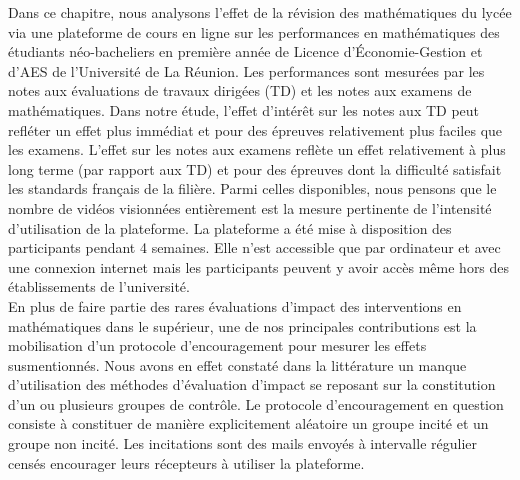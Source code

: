 \documentclass[
]{book}
\begin{document}
Dans ce chapitre, nous analysons l'effet de la révision des mathématiques du lycée via une plateforme de cours en ligne sur les performances en mathématiques des étudiants néo-bacheliers en première année de Licence d'Économie-Gestion et d'AES de l'Université de La Réunion. Les performances sont mesurées par les notes aux évaluations de travaux dirigées (TD) et les notes aux examens de mathématiques. Dans notre étude, l'effet d'intérêt sur les notes aux TD peut refléter un effet plus immédiat et pour des épreuves relativement plus faciles que les examens. L'effet sur les notes aux examens reflète un effet relativement à plus long terme (par rapport aux TD) et pour des épreuves dont la difficulté satisfait les standards français de la filière. Parmi celles disponibles, nous pensons que le nombre de vidéos visionnées entièrement est la mesure pertinente de l'intensité d'utilisation de la plateforme. La plateforme a été mise à disposition des participants pendant 4 semaines. Elle n'est accessible que par ordinateur et avec une connexion internet mais les participants peuvent y avoir accès même hors des établissements de l'université.\\
En plus de faire partie des rares évaluations d'impact des interventions en mathématiques dans le supérieur, une de nos principales contributions est la mobilisation d'un protocole d'encouragement pour mesurer les effets susmentionnés. Nous avons en effet constaté dans la littérature un manque d'utilisation des méthodes d'évaluation d'impact se reposant sur la constitution d'un ou plusieurs groupes de contrôle. Le protocole d'encouragement en question consiste à constituer de manière explicitement aléatoire un groupe incité et un groupe non incité. Les incitations sont des mails envoyés à intervalle régulier censés encourager leurs récepteurs à utiliser la plateforme.
\end{document}
